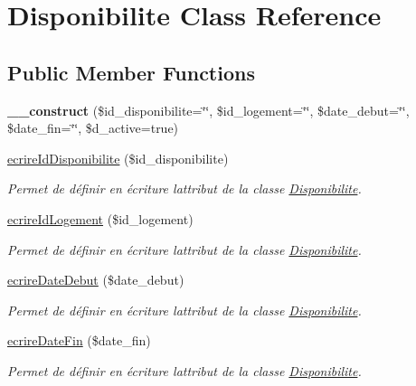 \hypertarget{class_disponibilite}{}\section{Disponibilite Class Reference}
\label{class_disponibilite}
\subsection*{Public Member Functions}
\begin{DoxyCompactItemize}
\item 
\mbox{\label{class_disponibilite_a7186c3c95787632f0392734c20919db0}} 
{\bfseries \+\_\+\+\_\+construct} (\$id\+\_\+disponibilite=\char`\"{}\char`\"{}, \$id\+\_\+logement=\char`\"{}\char`\"{}, \$date\+\_\+debut=\char`\"{}\char`\"{}, \$date\+\_\+fin=\char`\"{}\char`\"{}, \$d\+\_\+active=true)
\item 
\hyperlink{class_disponibilite_a0b085b75bdd83560abea34cb19dafb0c}{ecrire\+Id\+Disponibilite} (\$id\+\_\+disponibilite)
\begin{DoxyCompactList}\small\item\em Permet de définir en écriture l\textquotesingle{}attribut de la classe \hyperlink{class_disponibilite}{Disponibilite}. \end{DoxyCompactList}\item 
\hyperlink{class_disponibilite_a18355ba0d58949eaad8b398505f0831b}{ecrire\+Id\+Logement} (\$id\+\_\+logement)
\begin{DoxyCompactList}\small\item\em Permet de définir en écriture l\textquotesingle{}attribut de la classe \hyperlink{class_disponibilite}{Disponibilite}. \end{DoxyCompactList}\item 
\hyperlink{class_disponibilite_a68f38dbdb90bafa297624bfd21a8a383}{ecrire\+Date\+Debut} (\$date\+\_\+debut)
\begin{DoxyCompactList}\small\item\em Permet de définir en écriture l\textquotesingle{}attribut de la classe \hyperlink{class_disponibilite}{Disponibilite}. \end{DoxyCompactList}\item 
\hyperlink{class_disponibilite_ac17ef36cb1ff05e49a51ed98040b0ffc}{ecrire\+Date\+Fin} (\$date\+\_\+fin)
\begin{DoxyCompactList}\small\item\em Permet de définir en écriture l\textquotesingle{}attribut de la classe \hyperlink{class_disponibilite}{Disponibilite}. \end{DoxyCompactList}\item 

\end{DoxyCompactItemize}
